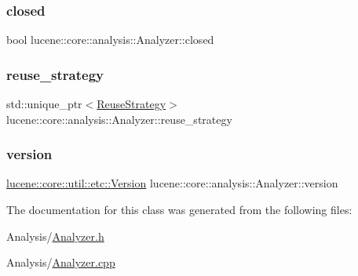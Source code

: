 \subsubsection{\texorpdfstring{closed}{closed}}
{\footnotesize\ttfamily bool lucene\+::core\+::analysis\+::\+Analyzer\+::closed\hspace{0.3cm}{\ttfamily [private]}}

\mbox{\label{classlucene_1_1core_1_1analysis_1_1Analyzer_a8c0924436e0392015b0b3df59d35717c}} 
\subsubsection{\texorpdfstring{reuse\+\_\+strategy}{reuse\_strategy}}
{\footnotesize\ttfamily std\+::unique\+\_\+ptr$<$\mbox{\hyperlink{classlucene_1_1core_1_1analysis_1_1Analyzer_1_1ReuseStrategy}{Reuse\+Strategy}}$>$ lucene\+::core\+::analysis\+::\+Analyzer\+::reuse\+\_\+strategy\hspace{0.3cm}{\ttfamily [private]}}

\mbox{\label{classlucene_1_1core_1_1analysis_1_1Analyzer_ac04041d68279aa308509d8e8cfcf89e1}} 
\subsubsection{\texorpdfstring{version}{version}}
{\footnotesize\ttfamily \mbox{\hyperlink{classlucene_1_1core_1_1util_1_1etc_1_1Version}{lucene\+::core\+::util\+::etc\+::\+Version}} lucene\+::core\+::analysis\+::\+Analyzer\+::version\hspace{0.3cm}{\ttfamily [private]}}



The documentation for this class was generated from the following files\+:\begin{DoxyCompactItemize}
\item 
Analysis/\mbox{\hyperlink{Analyzer_8h}{Analyzer.\+h}}\item 
Analysis/\mbox{\hyperlink{Analyzer_8cpp}{Analyzer.\+cpp}}\end{DoxyCompactItemize}
